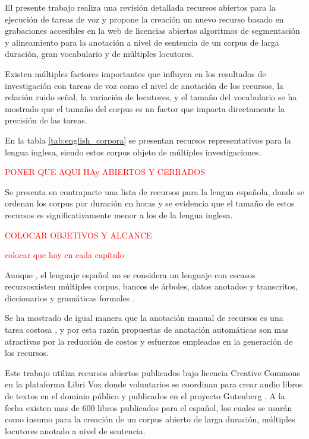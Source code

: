 El presente trabajo realiza una revisión detallada  recursos abiertos para la ejecución de tareas de voz y propone la creación  un nuevo recurso basado en grabaciones accesibles en la web de licencias abiertas algoritmos de segmentación y alineamiento para la anotación a nivel de sentencia de un corpus de larga duración, gran vocabulario y de múltiples locutores.

Existen múltiples factores importantes que influyen en los resultados de investigación con tareas de voz como el nivel de anotación de los recursos, la relación ruido señal, la variación de locutores, y el tamaño del vocabulario se ha mostrado que el tamaño del corpus es un factor que impacta directamente la precisión de las tareas. 

En la tabla \ref{tab:english_corpora} se presentan recursos representativos para la lengua inglesa, siendo estos corpus objeto de múltiples investigaciones. 

\textcolor{red}{PONER QUE AQUI HAy ABIERTOS Y CERRADOS}



Se presenta en contraparte una lista de recursos para la lengua española, donde se ordenan los corpus por duración en horas y se evidencia que el tamaño de estos recursos es significativamente  menor a los de la lengua inglesa.

\textcolor{red}{COLOCAR OBJETIVOS Y ALCANCE}

\textcolor{red}{colocar que hay en cada capítulo}



Aunque , el lenguaje español no se considera un lenguaje con escasos recursosxisten múltiples corpus, bancos de árboles, datos anotados y transcritos, diccionarios y gramáticas formales \cite{CavarGlobalGORILLA}. 

Se ha mostrado de igual manera que la anotación manual de recursos es una tarea costosa \cite{googleTTSLatinAmericanSpanishCorpus}, y por esta razón propuestas de anotación automáticas son mas atractivas por la reducción de costos y esfuerzos empleadas en  la generación de los recursos.

Este trabajo utiliza recursos abiertos publicados bajo licencia Creative Commons en la plataforma Libri Vox \cite{LibriVox} donde voluntarios se coordinan para crear audio libros de textos en el dominio público y publicados en el proyecto Gutenberg \cite{gutenberg}. A la fecha existen mas de 600 libros publicados para el español, los cuales se usarán como insumo para la creación de un corpus abierto de larga duración, múltiples locutores anotado a nivel de sentencia.